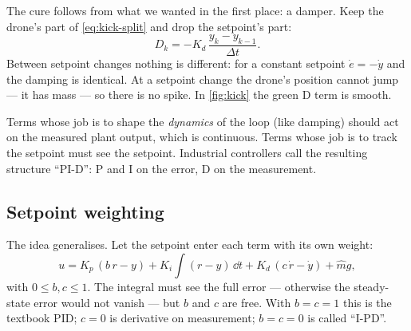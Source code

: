 The cure follows from what we wanted in the first place: a damper. Keep the drone's part of \cref{eq:kick-split} and drop the setpoint's part:
\begin{equation}\label{eq:kick-dom}
  D_k = -K_d\,\frac{y_k - y_{k-1}}{\Delta t}.
\end{equation}
Between setpoint changes nothing is different: for a constant setpoint $\dot e = -\dot y$ and the damping is identical. At a setpoint change the drone's position cannot jump — it has mass — so there is no spike. In \cref{fig:kick} the green D term is smooth.

\begin{keyidea}
Terms whose job is to shape the \emph{dynamics} of the loop (like damping) should act on the measured plant output, which is continuous. Terms whose job is to track the setpoint must see the setpoint. Industrial controllers call the resulting structure \enquote{PI-D}: P and I on the error, D on the measurement.
\end{keyidea}

\subsection{Setpoint weighting}
The idea generalises. Let the setpoint enter each term with its own weight:
\begin{equation}\label{eq:kick-weights}
  u = K_p\,(b\,r - y) + K_i\!\int (r - y)\,\dd t + K_d\,(c\,\dot r - \dot y) + \hat m g,
\end{equation}
with $0 \le b, c \le 1$. The integral must see the full error — otherwise the steady-state error would not vanish — but $b$ and $c$ are free. With $b = c = 1$ this is the textbook PID; $c = 0$ is derivative on measurement; $b = c = 0$ is called \enquote{I-PD}.

